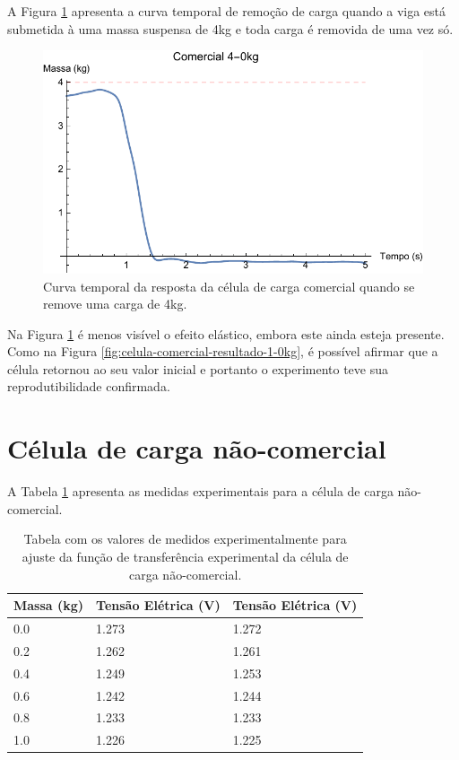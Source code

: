 \documentclass[a4paper]{instrumentacao}
\begin{document}
A Figura \ref{fig:celula-comercial-resultado-4-0kg} apresenta a curva temporal de remoção de carga quando a viga está submetida à uma massa suspensa de 4kg e toda carga é removida de uma vez só.

\begin{figure}[H]
\center
\includegraphics[width=\textwidth]{Comercial_4-0kg.pdf}
\caption{Curva temporal da resposta da célula de carga comercial quando se remove uma carga de 4kg.}
\label{fig:celula-comercial-resultado-4-0kg}
\end{figure}

Na Figura \ref{fig:celula-comercial-resultado-4-0kg} é menos visível o efeito elástico, embora este ainda esteja presente. Como na Figura \ref{fig:celula-comercial-resultado-1-0kg}, é possível afirmar que a célula retornou ao seu valor inicial e portanto o experimento teve sua reprodutibilidade confirmada.

\section{Célula de carga não-comercial}
A Tabela \ref{tab:celula-nao-comercial-resultado-funcao-transferencia} apresenta as medidas experimentais para a célula de carga não-comercial.


\begin{table}[H]
\centering
\caption{Tabela com os valores de medidos experimentalmente para ajuste da função de transferência experimental da célula de carga não-comercial.}
\begin{tabular}{|l|l|l|}

\hline
\textbf{Massa (kg)} & \textbf{Tensão Elétrica (V)} & \textbf{Tensão Elétrica (V)} \\ \hline
 0.0 & 1.273 & 1.272 \\ \hline
 0.2 & 1.262 & 1.261 \\ \hline
 0.4 & 1.249 & 1.253 \\ \hline
 0.6 & 1.242 & 1.244 \\ \hline
 0.8 & 1.233 & 1.233 \\ \hline
 1.0 & 1.226 & 1.225 \\ \hline
\end{tabular}
\label{tab:celula-nao-comercial-resultado-funcao-transferencia}
\end{table}
\end{document}
